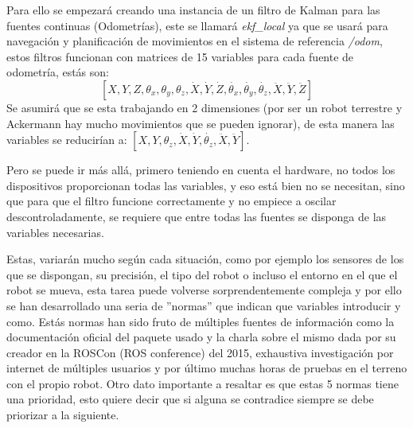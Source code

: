 Para ello se empezará creando una instancia de un filtro de Kalman para las fuentes continuas (Odometrías), este se llamará 
\textit{ekf\_local} ya que se usará para navegación y planificación de movimientos en el sistema de referencia \textit{/odom}, estos 
filtros funcionan con matrices de 15 variables para cada fuente de odometría, estás son: 
$$[ X,Y,Z,\theta_{x},\theta_{y},\theta_{z},\dot{X},\dot{Y},\dot{Z},\dot{\theta_{x}},\dot{\theta_{y}},\dot{\theta_{z}},\ddot{X},\ddot{Y},\ddot{Z} ]$$
Se asumirá que se esta trabajando en 2 dimensiones (por ser un robot terrestre y Ackermann hay mucho movimientos que se pueden 
ignorar), de esta manera las variables se reducirían a: 
$[ X,Y,\theta_{z},\dot{X},\dot{Y},\dot{\theta_{z}},\ddot{X},\ddot{Y}]$.

Pero se puede ir más allá, primero teniendo en cuenta el hardware, no todos los dispositivos proporcionan todas las variables, y eso está bien no se necesitan, sino que para que 
el filtro funcione correctamente y no empiece a oscilar descontroladamente, se requiere que entre 
todas las fuentes se disponga de las variables necesarias.

Estas, variarán mucho según cada situación, como por ejemplo los sensores de los que se dispongan, su precisión, el 
tipo del robot o incluso el entorno en el que el robot se mueva, esta tarea puede volverse sorprendentemente compleja
y por ello se han desarrollado una seria de ''normas'' que indican que variables introducir y como. Estás normas han sido fruto de múltiples 
fuentes de información como la documentación oficial del paquete usado y la charla sobre el mismo dada por su creador en la ROSCon 
(ROS conference) del 2015, exhaustiva investigación por internet de múltiples usuarios y por último muchas horas de pruebas en el terreno 
con el propio robot. Otro dato importante a resaltar es que estas 5 normas tiene una prioridad, esto quiere decir que si alguna se 
contradice siempre se debe priorizar a la siguiente.  

